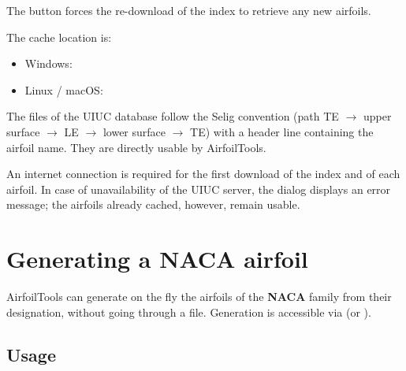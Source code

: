 The  button forces the re-download of the index to
retrieve any new airfoils.

The cache location is:

\begin{itemize}
    \item Windows: 
    \item Linux / macOS: 
\end{itemize}

\begin{noteinfo}
The  files of the UIUC database follow the
Selig convention (path TE $\rightarrow$ upper surface $\rightarrow$
LE $\rightarrow$ lower surface $\rightarrow$ TE) with a header
line containing the airfoil name. They are directly
usable by AirfoilTools.
\end{noteinfo}

\begin{attention}
An internet connection is required for the first download of the
index and of each airfoil. In case of unavailability of the UIUC
server, the dialog displays an error message; the airfoils already
cached, however, remain usable.
\end{attention}

\section{Generating a NACA airfoil}
\label{sec:naca}

AirfoilTools can generate on the fly the airfoils of the
\textbf{NACA} family from their designation, without going through a
file. Generation is accessible via  (or
).


\subsection{Usage}

